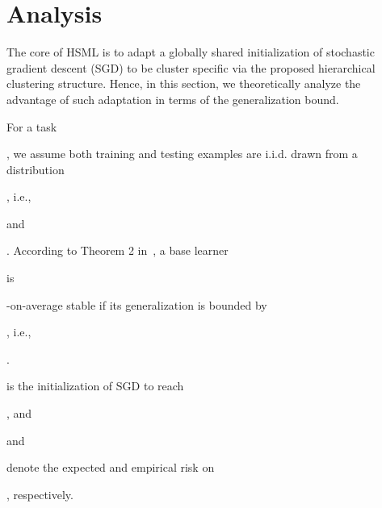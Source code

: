\documentclass{article}
\begin{document}
 \section{Analysis}
The 
core 
of HSML is to adapt a 
globally shared initialization of stochastic gradient descent (SGD) to be cluster specific via the proposed hierarchical clustering structure. 
Hence, in this section, we theoretically analyze the advantage of such adaptation in terms of the generalization bound. 

For a task \begin{small}\end{small}, we assume both training and testing examples are i.i.d. drawn from a distribution \begin{small}\end{small} 
, i.e., \begin{small}\end{small} and \begin{small}\end{small}. 
According to 
Theorem 2 in~\cite{kuzborskij2017data}, a base learner 
\begin{small}\end{small} is \begin{small}\end{small}-on-average stable if its generalization is bounded by \begin{small}\end{small}, i.e., \begin{small}\end{small}. \begin{small}\end{small} is the initialization of SGD to reach \begin{small}\end{small}, and \begin{small}\end{small} and \begin{small}\end{small} denote the expected and empirical risk on \begin{small}

\end{small}, respectively. 
\end{document}
